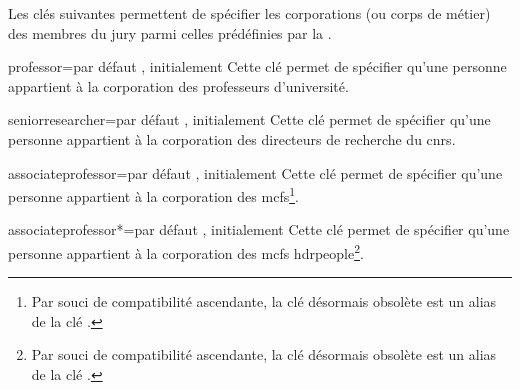 Les clés suivantes\syntaxeoptions{} permettent de spécifier les corporations (ou
corps de métier) des membres du jury parmi celles prédéfinies par la \yatCl{}.

\begin{docKey}{professor}{=\textbar{}}{par défaut
    , initialement }
  Cette clé permet de spécifier qu'une personne appartient à la corporation des
  professeurs d'université.
\end{docKey}
%
\begin{docKey}{seniorresearcher}{=\textbar{}}{par
    défaut , initialement }
  Cette clé permet de spécifier qu'une personne appartient à la corporation des
  directeurs de recherche du \gls{cnrs}.
\end{docKey}
%
\begin{docKey}[][doc updated=2016-10-30]{associateprofessor}{=\textbar{}}{par défaut
    , initialement }
  Cette clé permet de spécifier qu'une personne appartient à la corporation des
  \glspl{mcf}\footnote{Par souci de compatibilité ascendante, la clé désormais
    obsolète  est un alias de la clé .}.
\end{docKey}
%
\begin{docKey}[][doc updated=2016-10-30]{associateprofessor*}{=\textbar{}}{par défaut
    , initialement }
  Cette clé permet de spécifier qu'une personne appartient à la corporation des
  \glspl{mcf} \acrshort{hdrpeople}\footnote{Par souci de compatibilité
    ascendante, la clé désormais obsolète  est un alias de la clé
    .}.
\end{docKey}
